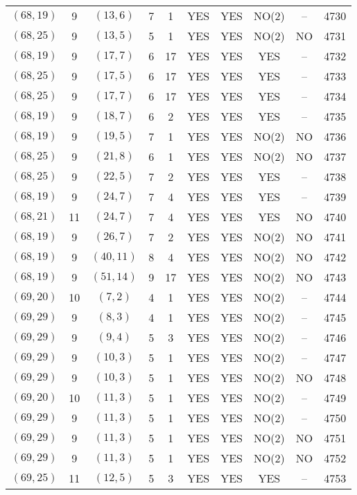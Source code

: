 \begin{longtable}{|c|c|c|c|c|c|c|c|c|c|}
$(68, 19)$ & 9 & $(13, 6)$ & 7 & 1 & YES & YES & NO(2) & -- & 4730\\
$(68, 25)$ & 9 & $(13, 5)$ & 5 & 1 & YES & YES & NO(2) & NO & 4731\\
$(68, 19)$ & 9 & $(17, 7)$ & 6 & 17 & YES & YES & YES & -- & 4732\\
$(68, 25)$ & 9 & $(17, 5)$ & 6 & 17 & YES & YES & YES & -- & 4733\\
$(68, 25)$ & 9 & $(17, 7)$ & 6 & 17 & YES & YES & YES & -- & 4734\\
$(68, 19)$ & 9 & $(18, 7)$ & 6 & 2 & YES & YES & YES & -- & 4735\\
$(68, 19)$ & 9 & $(19, 5)$ & 7 & 1 & YES & YES & NO(2) & NO & 4736\\
$(68, 25)$ & 9 & $(21, 8)$ & 6 & 1 & YES & YES & NO(2) & NO & 4737\\
$(68, 25)$ & 9 & $(22, 5)$ & 7 & 2 & YES & YES & YES & -- & 4738\\
$(68, 19)$ & 9 & $(24, 7)$ & 7 & 4 & YES & YES & YES & -- & 4739\\
$(68, 21)$ & 11 & $(24, 7)$ & 7 & 4 & YES & YES & YES & NO & 4740\\
$(68, 19)$ & 9 & $(26, 7)$ & 7 & 2 & YES & YES & NO(2) & NO & 4741\\
$(68, 19)$ & 9 & $(40, 11)$ & 8 & 4 & YES & YES & NO(2) & NO & 4742\\
$(68, 19)$ & 9 & $(51, 14)$ & 9 & 17 & YES & YES & NO(2) & NO & 4743\\
$(69, 20)$ & 10 & $(7, 2)$ & 4 & 1 & YES & YES & NO(2) & -- & 4744\\
$(69, 29)$ & 9 & $(8, 3)$ & 4 & 1 & YES & YES & NO(2) & -- & 4745\\
$(69, 29)$ & 9 & $(9, 4)$ & 5 & 3 & YES & YES & NO(2) & -- & 4746\\
$(69, 29)$ & 9 & $(10, 3)$ & 5 & 1 & YES & YES & NO(2) & -- & 4747\\
$(69, 29)$ & 9 & $(10, 3)$ & 5 & 1 & YES & YES & NO(2) & NO & 4748\\
$(69, 20)$ & 10 & $(11, 3)$ & 5 & 1 & YES & YES & NO(2) & -- & 4749\\
$(69, 29)$ & 9 & $(11, 3)$ & 5 & 1 & YES & YES & NO(2) & -- & 4750\\
$(69, 29)$ & 9 & $(11, 3)$ & 5 & 1 & YES & YES & NO(2) & NO & 4751\\
$(69, 29)$ & 9 & $(11, 3)$ & 5 & 1 & YES & YES & NO(2) & NO & 4752\\
$(69, 25)$ & 11 & $(12, 5)$ & 5 & 3 & YES & YES & YES & -- & 4753\\

\end{longtable}
